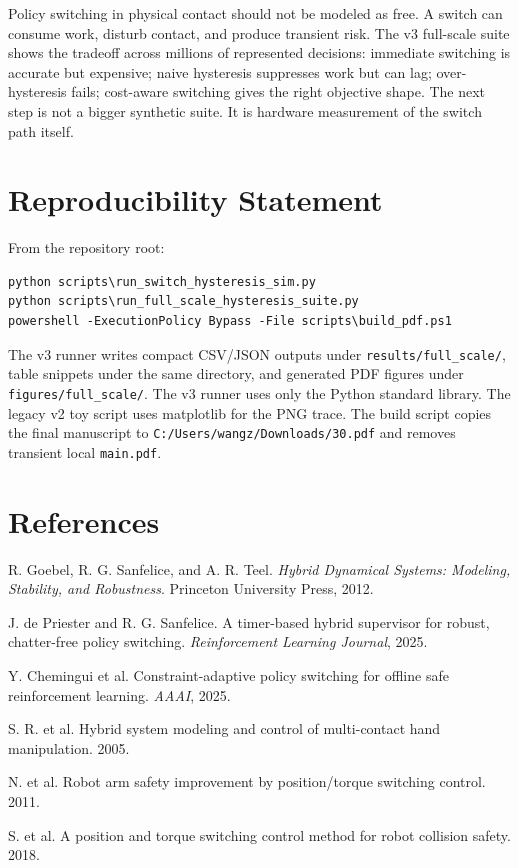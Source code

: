 \documentclass{article}
\begin{document}
Policy switching in physical contact should not be modeled as free.
A switch can consume work, disturb contact, and produce transient risk.
The v3 full-scale suite shows the tradeoff across millions of represented decisions: immediate switching is accurate but expensive; naive hysteresis suppresses work but can lag; over-hysteresis fails; cost-aware switching gives the right objective shape.
The next step is not a bigger synthetic suite.
It is hardware measurement of the switch path itself.

\section*{Reproducibility Statement}

From the repository root:
\begin{verbatim}
python scripts\run_switch_hysteresis_sim.py
python scripts\run_full_scale_hysteresis_suite.py
powershell -ExecutionPolicy Bypass -File scripts\build_pdf.ps1
\end{verbatim}
The v3 runner writes compact CSV/JSON outputs under \texttt{results/full\_scale/}, table snippets under the same directory, and generated PDF figures under \texttt{figures/full\_scale/}.
The v3 runner uses only the Python standard library.
The legacy v2 toy script uses matplotlib for the PNG trace.
The build script copies the final manuscript to \texttt{C:/Users/wangz/Downloads/30.pdf} and removes transient local \texttt{main.pdf}.

\section*{References}
\small
R. Goebel, R. G. Sanfelice, and A. R. Teel.
\emph{Hybrid Dynamical Systems: Modeling, Stability, and Robustness}.
Princeton University Press, 2012.

J. de Priester and R. G. Sanfelice.
A timer-based hybrid supervisor for robust, chatter-free policy switching.
\emph{Reinforcement Learning Journal}, 2025.

Y. Chemingui et al.
Constraint-adaptive policy switching for offline safe reinforcement learning.
\emph{AAAI}, 2025.

S. R. et al.
Hybrid system modeling and control of multi-contact hand manipulation.
2005.

N. et al.
Robot arm safety improvement by position/torque switching control.
2011.

S. et al.
A position and torque switching control method for robot collision safety.
2018.
\end{document}
